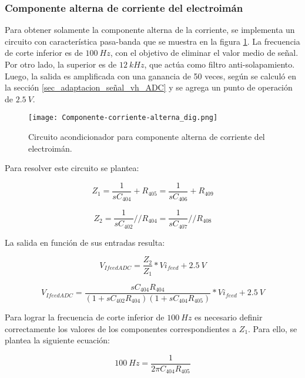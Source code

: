 \subsubsection{Componente  alterna de corriente del electroimán}

 Para obtener solamente la componente alterna de la corriente, se implementa un circuito con característica pasa-banda que se muestra en la figura \ref{fig:componente-corriente-alterna}. La frecuencia de corte inferior  es de $100\:Hz$, con el objetivo de eliminar el valor medio de señal. Por otro lado, la superior es de $12\:kHz$, que actúa como filtro anti-solapamiento. Luego, la salida es amplificada con una ganancia de 50 veces, según se calculó en la sección \ref{sec_adaptacion_señal_vh_ADC} y se agrega un punto de operación de $2.5\:V$.


\begin{figure}[H]
	\centering
	\texttt{[image: Componente-corriente-alterna\_dig.png]}
	\caption{ Circuito acondicionador para componente alterna de corriente del electroimán.
	}
	\label{fig:componente-corriente-alterna}
\end{figure}

Para resolver este circuito se plantea:

\begin{equation*} 
	Z_1=\frac{1}{sC_{404}}+R_{405}=\frac{1}{sC_{406}}+R_{409}
\end{equation*}

\begin{equation*} 
	Z_2=\frac{1}{sC_{402}}//R_{404}=\frac{1}{sC_{407}}//R_{408}
\end{equation*}

La salida en función de sus entradas resulta:

\begin{equation*} 
	V_{IfeedADC} =\frac{Z_2}{Z_1}*Vi_{feed}+2.5\:V
\end{equation*}

\begin{equation*} 
	V_{IfeedADC} =\frac{sC_{404}R_{404}}{(1+sC_{402}R_{404})(1+sC_{404}R_{405})}*Vi_{feed}+2.5\:V
\end{equation*}

Para lograr la frecuencia de corte inferior de $100\:Hz$ es necesario definir correctamente los valores de los componentes correspondientes a $Z_1$. Para ello, se plantea la siguiente ecuación:

\begin{equation*} 
	100\:Hz=\frac{1}{2\pi C_{404}R_{405}}
\end{equation*}

